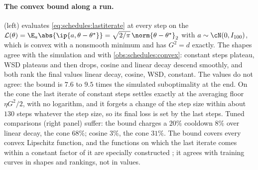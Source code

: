 \begin{refsection}
\paragraph{The convex bound along a run.}  (left) evaluates \eqref{eq:schedules:lastiterate} at every step on the  $\Loss(\theta)=\E_a\abs{\ip{a,\theta-\theta^\star}}=\sqrt{2/\pi}\,\norm{\theta-\theta^\star}_2$ with $a\sim\cN(0,I_{100})$, which is convex with a nonsmooth minimum and has $G^2=d$ exactly. The shapes agree with the simulation and with \cref{obs:schedules:convex}: constant steps plateau, WSD plateaus and then drops, cosine and linear decay descend smoothly, and both rank the final values linear decay, cosine, WSD, constant. The values do not agree: the bound is $7.6$ to $9.5$ times the simulated suboptimality at the end. On the cone the last iterate of constant steps settles exactly at the averaging floor $\eta G^2/2$, with no logarithm, and it forgets a change of the step size within about $130$ steps whatever the step size, so its final loss is set by the last steps. Tuned comparisons (right panel) suffer: the bound charges a $20\%$ cooldown $8\%$ over linear decay, the cone $68\%$; cosine $3\%$, the cone $31\%$. The bound covers every convex Lipschitz function, and the functions on which the last iterate comes within a constant factor of it are specially constructed \parencite{HarveyEtAl2019,ZamaniGlineur2025}; it agrees with training curves in shapes and rankings, not in values.


\end{refsection}
